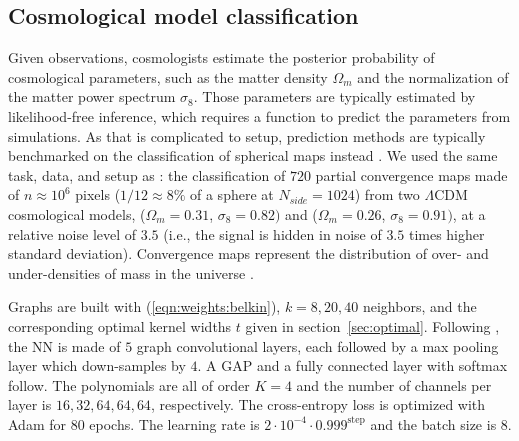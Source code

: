 \documentclass{article} %
\newcommand{\secref}[1]{section~\ref{sec:#1}}
\newcommand{\eqnref}[1]{(\ref{eqn:#1})}
\begin{document}

\subsection{Cosmological model classification} \label{sec:exp:cosmo}

Given observations, cosmologists estimate the posterior probability of cosmological parameters, such as the matter density $\Omega_m$ and the normalization of the matter power spectrum $\sigma_8$.
Those parameters are typically estimated by likelihood-free inference, which requires a function to predict the parameters from simulations.
As that is complicated to setup, prediction methods are typically benchmarked on the classification of spherical maps instead \citep{schmelze2017cosmologicalmodel}.
We used the same task, data, and setup as \citet{perraudin2019deepspherecosmo}: the classification of $720$ partial convergence maps made of $n \approx 10^6$ pixels ($1/12 \approx 8\%$ of a sphere at $N_{side} = 1024$) from two $\Lambda$CDM cosmological models, ($\Omega_m = 0.31$, $\sigma_8 = 0.82)$ and ($\Omega_m = 0.26$, $\sigma_8 = 0.91)$, at a relative noise level of $3.5$ (i.e., the signal is hidden in noise of $3.5$ times higher standard deviation).
Convergence maps represent the distribution of over- and under-densities of mass in the universe \citep[see][for a review of gravitational lensing]{bartelman2010gravitationallensing}.

Graphs are built with \eqnref{weights:belkin}, $k = 8, 20, 40$ neighbors, and the corresponding optimal kernel widths $t$ given in \secref{optimal}.
Following \citet{perraudin2019deepspherecosmo}, the NN is made of $5$ graph convolutional layers, each followed by a max pooling layer which down-samples by $4$.
A GAP and a fully connected layer with softmax follow.
The polynomials are all of order $K=4$ and the number of channels per layer is $16, 32, 64, 64, 64$, respectively.
The cross-entropy loss is optimized with Adam for 80 epochs.
The learning rate is $2 \cdot 10^{-4} \cdot 0.999^{\textrm{step}}$ and the batch size is 8.
\end{document}
